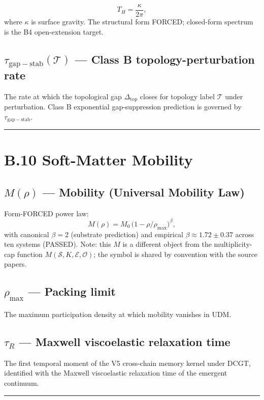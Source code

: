 \documentclass[11pt]{book}
\begin{document}
\[
T_H = \frac{\kappa}{2\pi},
\]
where $\kappa$ is surface gravity. The structural form FORCED; closed-form spectrum is the B4 open-extension target.

\subsection{$\tau_\mathrm{gap-stab}(\mathcal{T})$ — Class B topology-perturbation rate}

The rate at which the topological gap $\Delta_\mathrm{top}$ closes for topology label $\mathcal{T}$ under perturbation. Class B exponential gap-suppression prediction is governed by $\tau_\mathrm{gap-stab}$.

\bigskip\hrule\bigskip

\section{B.10 Soft-Matter Mobility}

\subsection{$M(\rho)$ — Mobility (Universal Mobility Law)}

Form-FORCED power law:
\[
M(\rho) = M_0\,\big(1 - \rho/\rho_\mathrm{max}\big)^\beta,
\]
with canonical $\beta = 2$ (substrate prediction) and empirical $\beta \approx 1.72 \pm 0.37$ across ten systems (PASSED). Note: this $M$ is a different object from the multiplicity-cap function $M(\mathcal{S}, K, \mathcal{E}, \mathcal{O})$; the symbol is shared by convention with the source papers.

\subsection{$\rho_\mathrm{max}$ — Packing limit}

The maximum participation density at which mobility vanishes in UDM.

\subsection{$\tau_R$ — Maxwell viscoelastic relaxation time}

The first temporal moment of the V5 cross-chain memory kernel under DCGT, identified with the Maxwell viscoelastic relaxation time of the emergent continuum.

\bigskip\hrule\bigskip
\end{document}
